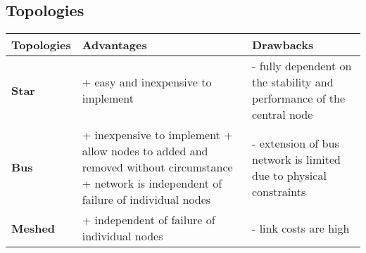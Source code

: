 \subsection{Topologies}

\begin{center}
    \begin{tabularx}{\linewidth}{|p{2.3cm}|p{6.2cm}|p{6.2cm}|}
        \hline
        \textbf{Topologies} & \textbf{Advantages} & \textbf{Drawbacks} \\
        \hline
        \textbf{Star}
          & + easy and inexpensive to implement 
          & - fully dependent on the stability and performance of the central node
          \\
        \hline
        \textbf{Bus} 
          & + inexpensive to implement \newline
            + allow nodes to added and removed without circumstance \newline
            + network is independent of failure of individual nodes
          & - extension of bus network is limited due to physical constraints
          \\
        \hline
        \textbf{Meshed} 
          & + independent of failure of individual nodes
          & - link costs are high
          \\
        \hline
    \end{tabularx}
\end{center}